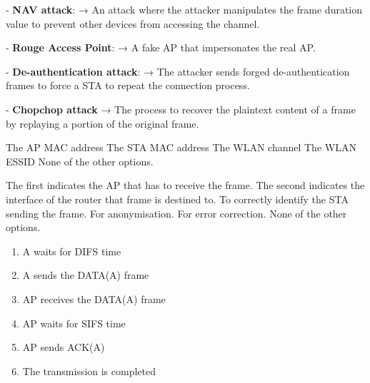\begin{questions}
\begin{solution}
        - \textbf{NAV attack}: → An attack where the attacker manipulates the frame duration value to prevent other devices from accessing the channel.

        - \textbf{Rouge Access Point}: → A fake AP that impersonates the real AP.

        - \textbf{De-authentication attack}: → The attacker sends forged de-authentication frames to force a STA to repeat the connection process.

        - \textbf{Chopchop attack} → The process to recover the plaintext content of a frame by replaying a portion of the original frame.
    \end{solution}



    \begin{checkboxes}
        \CorrectChoice The AP MAC address
        \CorrectChoice The STA MAC address
        \CorrectChoice The WLAN channel
        \choice The WLAN ESSID
        \choice None of the other options.
    \end{checkboxes}



    \begin{checkboxes}
        \CorrectChoice The first indicates the AP that has to receive the frame. The second indicates the interface of the router that frame is destined to.
        \choice To correctly identify the STA sending the frame.
        \choice For anonymisation.
        \choice For error correction.
        \choice None of the other options.
    \end{checkboxes}

    \begin{solution}
        \begin{enumerate}
            \item A waits for DIFS time
            \item A sends the DATA(A) frame
            \item AP receives the DATA(A) frame
            \item AP waits for SIFS time
            \item AP sends ACK(A)
            \item The transmission is completed
        \end{enumerate}
    \end{solution}


\end{questions}
